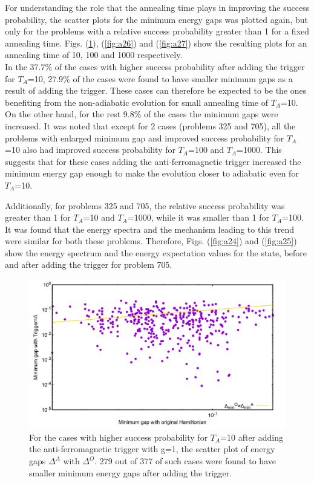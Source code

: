 \documentclass[../main.tex]{subfiles}
\begin{document}
For understanding the role that the annealing time plays in improving the success probability, the scatter plots for the minimum energy gaps was plotted again, but only for the problems with a relative success probability greater than 1 for a fixed annealing time. Figs. (\ref{fig:a23}), (\ref{fig:a26}) and (\ref{fig:a27}) show the resulting plots for an annealing time of 10, 100 and 1000 respectively.\\

In the 37.7\% of the cases with higher success probability after adding the trigger for $T_A$=10, 27.9\% of the cases were found to have smaller minimum gaps as a result of adding the trigger. These cases can therefore be expected to be the ones benefiting from the non-adiabatic evolution for small annealing time of $T_A$=10. On the other hand, for the rest 9.8\% of the cases the minimum gaps were increased. It was noted that except for 2 cases (problems 325 and 705), all the problems with enlarged minimum gap and improved success probability for $T_A$=10 also had improved success probability for $T_A$=100 and $T_A$=1000. This suggests that for these cases adding the anti-ferromagnetic trigger increased the minimum energy gap enough to make the evolution closer to adiabatic even for $T_A$=10. 

Additionally, for problems 325 and 705, the relative success probability was greater than 1 for $T_A$=10 and $T_A$=1000, while it was smaller than 1 for $T_A$=100. It was found that the energy spectra and the mechanism leading to this trend were similar for both these problems. Therefore, Figs. (\ref{fig:a24}) and (\ref{fig:a25}) show the energy spectrum and the energy expectation values for the state, before and after adding the trigger for problem 705.

\begin{figure}[H]
\centering 
\includegraphics[scale=0.22]{selected_T10_g1.png}
\caption{For the cases with higher success probability for $T_A$=10 after adding the anti-ferromagnetic trigger with g=1, the scatter plot of energy gaps $\Delta^A $ with $\Delta^O$. 279 out of 377 of such cases were found to have smaller minimum energy gaps after adding the trigger.}
\label{fig:a23}
\end{figure}
\end{document}
